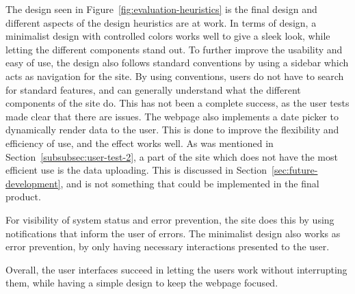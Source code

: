 The design seen in Figure~\ref{fig:evaluation-heuristics} is the final design
and different aspects of the design heuristics are at work.
In terms of design, a minimalist design with controlled colors works well
to give a sleek look, while letting the different components stand out.
To further improve the usability and easy of use, the design also follows
standard conventions by using a sidebar which acts as navigation for the site.
By using conventions, users do not have to search for standard features, and
can generally understand what the different components of the site do.
This has not been a complete success, as the user tests made clear that there
are issues.
The webpage also implements a date picker to dynamically render data to the user.
This is done to improve the flexibility and efficiency of use, and the effect
works well.
As was mentioned in Section~\ref{subsubsec:user-test-2}, a part of the site which
does not have the most efficient use is the data uploading.
This is discussed in Section~\ref{sec:future-development}, and is not something
that could be implemented in the final product.

For visibility of system status and error prevention, the site does this by using
notifications that inform the user of errors.
The minimalist design also works as error prevention, by only having necessary
interactions presented to the user.

Overall, the user interfaces succeed in letting the users work without interrupting
them, while having a simple design to keep the webpage focused.
